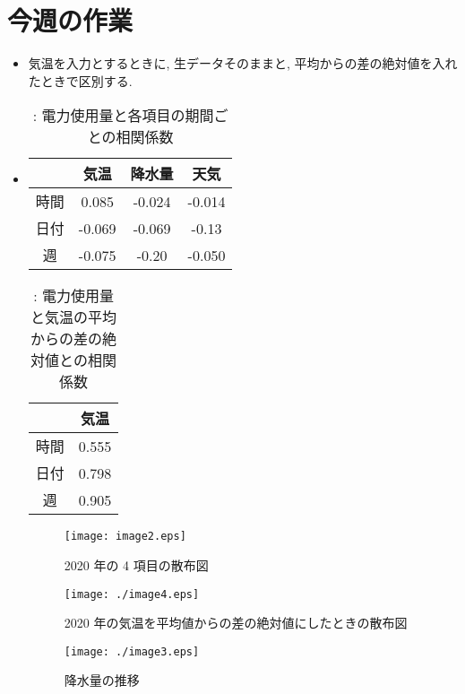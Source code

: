\section{今週の作業}
\begin{itemize}
        \item 気温を入力とするときに, 生データそのままと, 平均からの差の絶対値を入れたときで区別する.  
        \item 
\begin{table}[t]
\centering
  \caption{: 電力使用量と各項目の期間ごとの相関係数}
  \vspace{3mm}
  \begin{tabular}{|c||c|c|c|} \hline
     &  気温 & 降水量 & 天気 \\ \hline \hline
    時間 & 0.085 & -0.024 & -0.014 \\ \hline
    日付 & -0.069 & -0.069 & -0.13 \\ \hline
    週 & -0.075 & -0.20 & -0.050 \\ \hline
  \end{tabular}
\end{table}
\begin{table}[t]
\centering
  \caption{: 電力使用量と気温の平均からの差の絶対値との相関係数}
  \vspace{3mm}
  \begin{tabular}{|c||c|} \hline
     &  気温 \\ \hline \hline
    時間 & 0.555 \\ \hline
    日付 & 0.798 \\ \hline
    週 & 0.905 \\ \hline
  \end{tabular}
\end{table}
\begin{figure*}[!hb]
  \begin{center}
    \texttt{[image: image2.eps]}
    \caption{2020 年の 4 項目の散布図}
  \end{center}
\end{figure*}
\begin{figure*}[!hb]
  \begin{center}
    \texttt{[image: ./image4.eps]}
    \caption{2020 年の気温を平均値からの差の絶対値にしたときの散布図}
  \end{center}
\end{figure*}
\begin{figure*}[!hb]
  \begin{center}
    \texttt{[image: ./image3.eps]}
    \caption{降水量の推移}
  \end{center}
\end{figure*}
\end{itemize}
